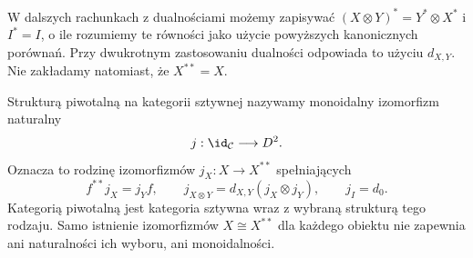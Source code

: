 W dalszych rachunkach z dualnościami możemy zapisywać $(X\otimes Y)^*=Y^*\otimes X^*$ i $I^*=I$, o ile rozumiemy te równości jako użycie powyższych kanonicznych porównań. Przy dwukrotnym zastosowaniu dualności odpowiada to użyciu $d_{X,Y}$. Nie zakładamy natomiast, że $X^{**}=X$.

\begin{definicja}\label{cat:def:tf-pivotal}
Strukturą piwotalną na kategorii sztywnej nazywamy monoidalny izomorfizm naturalny
\[
 j:\id_{\mathcal C}\longrightarrow D^2.
\]
Oznacza to rodzinę izomorfizmów $j_X:X\to X^{**}$ spełniających
\[
 f^{**}j_X=j_Y f,\qquad
 j_{X\otimes Y}=d_{X,Y}(j_X\otimes j_Y),\qquad j_I=d_0.
\]
Kategorią piwotalną jest kategoria sztywna wraz z wybraną strukturą tego rodzaju. Samo istnienie izomorfizmów $X\cong X^{**}$ dla każdego obiektu nie zapewnia ani naturalności ich wyboru, ani monoidalności.
\end{definicja}

